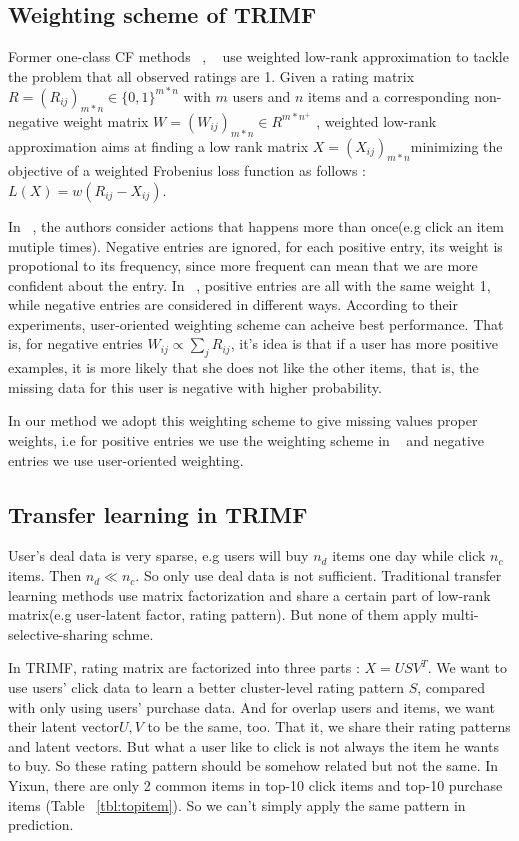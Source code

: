 \subsection{Weighting scheme of TRIMF}
  \par{Former one-class CF methods ~\cite{4781121}, ~\cite{4781145} use weighted low-rank approximation to tackle the problem that all observed ratings are 1. Given a rating matrix $R = (R_{ij})_{m*n} \in \{0, 1\}^{m*n}$ with $m$ users and $n$ items and a corresponding non-negative weight matrix $W = (W_{ij})_{m*n} \in R^{m*n^+}$ , weighted low-rank approximation aims at finding a low rank matrix $X = (X_{ij})_{m*n} $minimizing the objective of a weighted Frobenius loss function as follows : $L(X) = w(R_{ij} - X_{ij})$. 

In ~\cite{4781121}, the authors consider actions that happens more than once(e.g click an item mutiple times). Negative entries are ignored, for each positive entry, its weight is propotional to its frequency, since more frequent can mean that we are more confident about the entry. In ~\cite{4781145}, positive entries are all with the same weight 1, while negative entries are considered in different ways. According to their experiments, user-oriented weighting scheme can acheive best performance. That is, for negative entries $W_{ij} \propto \sum_j{R_{ij}}$, it's idea is that if a user has more positive examples, it is more likely that she does not like the other items, that is, the missing data for this user is negative with higher probability.

In our method we adopt this weighting scheme to give missing values proper weights, i.e for positive entries we use the weighting scheme in ~\cite{4781121} and negative entries we use user-oriented weighting.}
\subsection{Transfer learning in TRIMF}

User's deal data is very sparse, e.g users will buy $n_d$ items one day while click $n_c$ items. Then $n_d \ll n_c$. So only use deal data is not sufficient. Traditional transfer learning methods use matrix factorization and share a certain part of low-rank matrix(e.g user-latent factor, rating pattern). But none of them apply multi-selective-sharing schme.

In TRIMF, rating matrix are factorized into three parts : $X = USV^T$. We want to use users' click data to learn a better cluster-level rating pattern $S$, compared with only using users' purchase data. And for overlap users and items, we want their latent vector$U,V$ to be the same, too. That it, we share their rating patterns and latent vectors. But what a user like to click is not always the item he wants to buy. So these rating pattern should be somehow related but not the same. In Yixun, there are only 2 common items in top-10 click items and top-10 purchase items (Table ~\ref{tbl:topitem}). So we can't simply apply the same pattern in prediction.

